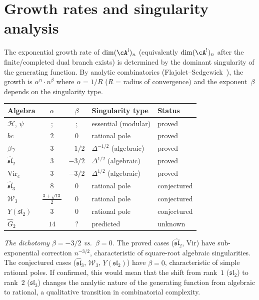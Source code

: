 \section{Growth rates and singularity analysis}
\label{sec:growth-rates}

The exponential growth rate of $\dim(\cA^{\mathrm i})_n$
\textup{(}equivalently $\dim(\cA^!)_n$ after the finite/completed dual
branch exists\textup{)} is determined by the dominant singularity of the
generating function. By analytic combinatorics
(Flajolet--Sedgewick~\cite{FlajoletSedgewick}), the growth is
$\alpha^n \cdot n^{\beta}$ where $\alpha = 1/R$ ($R$ = radius of
convergence) and the exponent~$\beta$ depends on the singularity type.

\begin{center}
\renewcommand{\arraystretch}{1.4}
\begin{tabular}{lccll}
\toprule
\textbf{Algebra} & $\alpha$ & $\beta$ & \textbf{Singularity type} & \textbf{Status} \\
\midrule
$\mathcal{H}$, $\psi$ &; &; & essential (modular) & proved \\
$bc$ & $2$ & $0$ & rational pole & proved \\
$\beta\gamma$ & $3$ & $-1/2$ & $\Delta^{-1/2}$ (algebraic) & proved \\
$\widehat{\mathfrak{sl}}_2$ & $3$ & $-3/2$ & $\Delta^{1/2}$ (algebraic) & proved \\
$\mathrm{Vir}_c$ & $3$ & $-3/2$ & $\Delta^{1/2}$ (algebraic) & proved \\
$\widehat{\mathfrak{sl}}_3$ & $8$ & $0$ & rational pole & conjectured \\
$\mathcal{W}_3$ & $\frac{3+\sqrt{13}}{2}$ & $0$ & rational pole & conjectured \\
$Y(\mathfrak{sl}_2)$ & $3$ & $0$ & rational pole & conjectured \\
$\widehat{G}_2$ & $14$ & ? & predicted & unknown \\
\bottomrule
\end{tabular}
\end{center}

\emph{The dichotomy $\beta = -3/2$ vs.\ $\beta = 0$.}
The proved cases ($\widehat{\mathfrak{sl}}_2$, $\mathrm{Vir}$) have sub-exponential correction $n^{-3/2}$, characteristic of square-root algebraic singularities. The conjectured cases ($\widehat{\mathfrak{sl}}_3$, $\mathcal{W}_3$, $Y(\mathfrak{sl}_2)$) have $\beta = 0$, characteristic of simple rational poles. If confirmed, this would mean that the shift from rank~$1$ ($\mathfrak{sl}_2$) to rank~$2$ ($\mathfrak{sl}_3$) changes the analytic nature of the generating function from algebraic to rational, a qualitative transition in combinatorial complexity.

